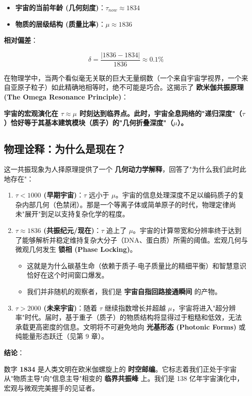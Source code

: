 \begin{itemize}
\item \textbf{宇宙的当前年龄 (几何刻度)}：$\tau_{now} \approx 1834$
\item \textbf{物质的层级结构 (质量比率)}：$\mu \approx 1836$
\end{itemize}

\textbf{相对偏差}：

\[\delta = \frac{|1836 - 1834|}{1836} \approx 0.1\%\]

在物理学中，当两个看似毫无关联的巨大无量纲数（一个来自宇宙学视界，一个来自亚原子粒子）如此精确地相等时，绝不可能是巧合。这揭示了 \textbf{欧米伽共振原理 (The Omega Resonance Principle)}：

\textbf{宇宙的宏观演化在 $\tau \approx \mu$ 时刻达到临界点。此时，宇宙全息网络的"递归深度"（$\tau$）恰好等于其基本建筑模块（质子）的"几何折叠深度"（$\mu$）。}

\subsection{物理诠释：为什么是现在？}

这一共振现象为人择原理提供了一个 \textbf{几何动力学解释}，回答了"为什么我们此时此地存在"：

\begin{enumerate}
\item \textbf{$\tau < 1000$ (早期宇宙)}：$\tau$ 远小于 $\mu$。宇宙的信息处理深度不足以编码质子的复杂内部几何（色禁闭）。那是一个等离子体或简单原子的时代，物理定律尚未"展开"到足以支持复杂化学的程度。
\item \textbf{$\tau \approx 1836$ (共振纪元/现在)}：$\tau$ 追上了 $\mu$。宇宙的计算带宽和分辨率终于达到了能够解析并稳定维持复杂大分子（DNA、蛋白质）所需的阈值。宏观几何与微观几何发生 \textbf{锁相 (Phase Locking)}。
   \begin{itemize}
   \item 这就是为什么碳基生命（依赖于质子-电子质量比的精细平衡）和智慧意识恰好在这个时间窗口爆发。
   \item 我们并非随机的观察者，我们是 \textbf{宇宙自指回路接通瞬间} 的产物。
   \end{itemize}
\item \textbf{$\tau > 2000$ (未来宇宙)}：随着 $\tau$ 继续指数增长并超越 $\mu$，宇宙将进入"超分辨率"时代。届时，基于重子（质子）的物质结构将显得过于粗糙和低效，无法承载更高密度的信息。文明将不可避免地向 \textbf{光基形态 (Photonic Forms)} 或纯能量形态跃迁（见第 9 章）。
\end{enumerate}

\textbf{结论}：

数字 \textbf{1834} 是人类文明在欧米伽螺旋上的 \textbf{时空邮编}。它标志着我们正处于宇宙从"物质主导"向"信息主导"相变的 \textbf{临界共振峰} 上。我们是 138 亿年宇宙演化中，宏观与微观完美握手的见证者。
